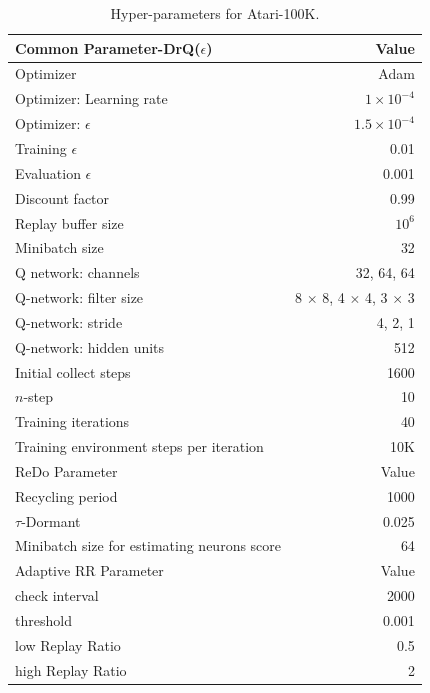 \begin{table}[ht]
\caption{Hyper-parameters for Atari-100K.}
\label{table:common_hyperparameters}
\vspace{-\baselineskip}
\begin{center}
\begin{tabular}{lr}
\toprule
Common Parameter-DrQ($\epsilon$)& Value \\
\midrule
Optimizer & Adam \\
Optimizer: Learning rate &  $1 \times 10^{-4}$ \\
Optimizer: $\epsilon$ & $1.5 \times 10^{-4}$ \\
Training $\epsilon$ & 0.01 \\
Evaluation $\epsilon$ & 0.001 \\
Discount factor & 0.99 \\
Replay buffer size & $10^6$ \\
Minibatch size & 32 \\
Q network: channels & 32, 64, 64 \\
Q-network: filter size & 8 $\times$ 8, 4 $\times$ 4, 3 $\times$ 3 \\
Q-network: stride & 4, 2, 1 \\ 
Q-network: hidden units &  512 \\
Initial collect steps & 1600 \\
$n$-step & 10 \\
Training iterations & 40 \\
Training environment steps per iteration & 10K \\
   \toprule
 ReDo Parameter& Value\\
\hline
Recycling period & 1000 \\
$\tau$-Dormant  & 0.025\\ 
Minibatch size for estimating neurons score & 64\\
 \toprule
 Adaptive RR Parameter & Value \\
   \hline
 check interval & 2000\\
 threshold & 0.001\\
 low Replay Ratio & 0.5 \\
 high Replay Ratio & 2\\

\bottomrule
\end{tabular}
\end{center}
\label{table:atari-config}
\vskip -0.1in
\end{table}


